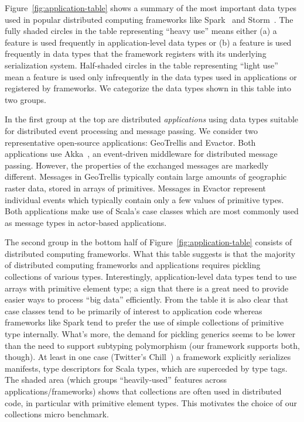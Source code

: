 Figure~\ref{fig:application-table} shows a summary of the most
important data types used in popular distributed computing frameworks
like Spark~\cite{Zaharia2012} and Storm~\cite{Storm}.
The fully shaded circles in the table representing ``heavy use'' means either
(a) a feature is used frequently in application-level data types or
(b) a feature is used frequently in data types that the framework registers
with its underlying serialization system.
Half-shaded circles in the table representing ``light use'' mean a feature is used
only infrequently in the data types used in applications or registered by
frameworks. We categorize the data types shown in this table into two groups.

In the first group at the top are distributed \emph{applications}
using data types suitable for distributed event processing and message
passing. We consider two representative open-source applications: GeoTrellis
and Evactor. Both applications use Akka~\cite{Akka}, an
event-driven middleware for distributed message passing. However, the
properties of the exchanged messages are markedly different. Messages
in GeoTrellis typically contain large amounts of geographic raster
data, stored in arrays of primitives. Messages in Evactor represent
individual events which typically contain only a few values of
primitive types. Both applications make use of Scala's case classes
which are most commonly used as message types in actor-based
applications.

The second group in the bottom half of Figure~\ref{fig:application-table}
consists of distributed computing {frameworks}. What this table
suggests is that the majority of distributed computing frameworks and
applications requires pickling collections of various
types. Interestingly, application-level data types tend to use arrays
with primitive element type; a sign that there is a great need to
provide easier ways to process ``big data'' efficiently. From the
table it is also clear that case classes tend to be primarily of
interest to application code whereas frameworks like Spark tend to
prefer the use of simple collections of primitive type
internally. What's more, the demand for pickling generics seems to be
lower than the need to support subtyping polymorphism (our framework
supports both, though). At least in one case (Twitter's Chill~\cite{TwitterChill}) a
framework explicitly serializes manifests, type descriptors for Scala
types, which are superceded by type tags.
The shaded area (which groups ``heavily-used'' features across
applications/frameworks) shows that collections are often used in distributed
code, in particular with primitive element types. This motivates the choice of
our collections micro benchmark.




